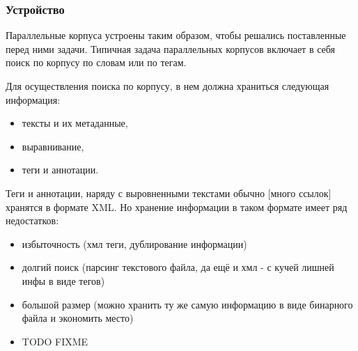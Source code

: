 
\subsubsection{Устройство}

Параллельные корпуса устроены таким образом, чтобы решались поставленные перед ними задачи.
Типичная задача параллельных корпусов включает в себя поиск по корпусу по словам или по тегам.

Для осуществления поиска по корпусу, в нем должна храниться следующая информация:
\begin{itemize}
    \item тексты и их метаданные,
    \item выравнивание,
    \item теги и аннотации.
\end{itemize}

Теги и аннотации, наряду с выровненными текстами обычно [много ссылок] хранятся в формате XML.
Но хранение информации в таком формате имеет ряд недостатков:
\begin{itemize}
    \item избыточность (хмл теги, дублирование информации)
    \item долгий поиск (парсинг текстового файла, да ещё и хмл - с кучей лишней инфы в виде тегов)
    \item большой размер (можно хранить ту же самую информацию в виде бинарного файла и экономить место)
    \item TODO FIXME
\end{itemize}


